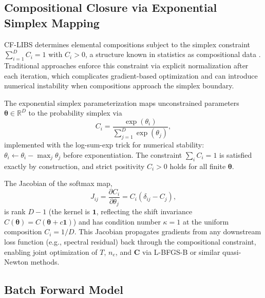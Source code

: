 \subsection{Compositional Closure via Exponential Simplex Mapping}
\label{sec:softmax}

CF-LIBS determines elemental compositions subject to the simplex constraint $\sum_{i=1}^D C_i = 1$ with $C_i > 0$, a structure known in statistics as compositional data \citep{Egozcue2003}.
Traditional approaches enforce this constraint via explicit normalization after each iteration, which complicates gradient-based optimization and can introduce numerical instability when compositions approach the simplex boundary.

The exponential simplex parameterization maps unconstrained parameters $\bm{\theta} \in \mathbb{R}^D$ to the probability simplex via
\begin{equation}
  C_i = \frac{\exp(\theta_i)}{\sum_{j=1}^D \exp(\theta_j)},
  \label{eq:softmax}
\end{equation}
implemented with the log-sum-exp trick for numerical stability: $\theta_i \leftarrow \theta_i - \max_j \theta_j$ before exponentiation.
The constraint $\sum_i C_i = 1$ is satisfied exactly by construction, and strict positivity $C_i > 0$ holds for all finite $\bm{\theta}$.

The Jacobian of the softmax map,
\begin{equation}
  J_{ij} = \frac{\partial C_i}{\partial \theta_j} = C_i(\delta_{ij} - C_j),
  \label{eq:softmax-jacobian}
\end{equation}
is rank $D - 1$ (the kernel is $\bm{1}$, reflecting the shift invariance $C(\bm{\theta}) = C(\bm{\theta} + c\bm{1})$) and has condition number $\kappa = 1$ at the uniform composition $C_i = 1/D$.
This Jacobian propagates gradients from any downstream loss function (e.g., spectral residual) back through the compositional constraint, enabling joint optimization of $T$, $n_e$, and $\bm{C}$ via L-BFGS-B or similar quasi-Newton methods.

\subsection{Batch Forward Model}
\label{sec:batch}

